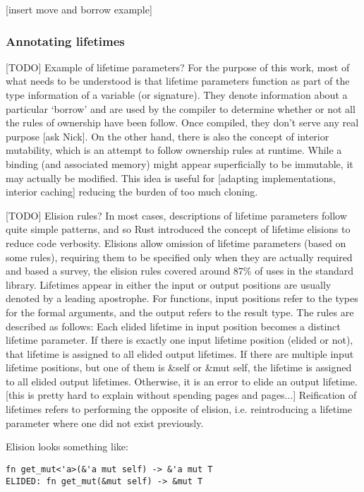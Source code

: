 [insert move and borrow example]

\subsubsection{Annotating lifetimes}
[TODO] Example of lifetime parameters? For the purpose of this work, most of what needs to be understood is that lifetime parameters function as part of the type information of a variable (or signature). They denote information about a particular `borrow' and are used by the compiler to determine whether or not all the rules of ownership have been follow. Once compiled, they don't serve any real purpose [ask Nick]. On the other hand, there is also the concept of interior mutability, which is an attempt to follow ownership rules at runtime. While a binding (and associated memory) might appear superficially to be immutable, it may actually be modified. This idea is useful for [adapting implementations, interior caching] reducing the burden of too much cloning.

[TODO] Elision rules? In most cases, descriptions of lifetime parameters follow quite simple patterns, and so Rust introduced the concept of lifetime elisions to reduce code verbosity. Elisions allow omission of lifetime parameters (based on some rules), requiring them to be specified only when they are actually required and based a survey, the elision rules covered around 87\% of uses in the standard library. Lifetimes appear in either the input or output positions are usually denoted by a leading apostrophe. For functions, input positions refer to the types for the formal arguments, and the output refers to the result type. The rules are described as follows: Each elided lifetime in input position becomes a distinct lifetime parameter. If there is exactly one input lifetime position (elided or not), that lifetime is assigned to all elided output lifetimes. If there are multiple input lifetime positions, but one of them is \&self or \&mut self, the lifetime is assigned to all elided output lifetimes. Otherwise, it is an error to elide an output lifetime. [this is pretty hard to explain without spending pages and pages...] Reification of lifetimes refers to performing the opposite of elision, i.e. reintroducing a lifetime parameter where one did not exist previously.

Elision looks something like:
\begin{verbatim}
fn get_mut<'a>(&'a mut self) -> &'a mut T
ELIDED: fn get_mut(&mut self) -> &mut T
\end{verbatim}

